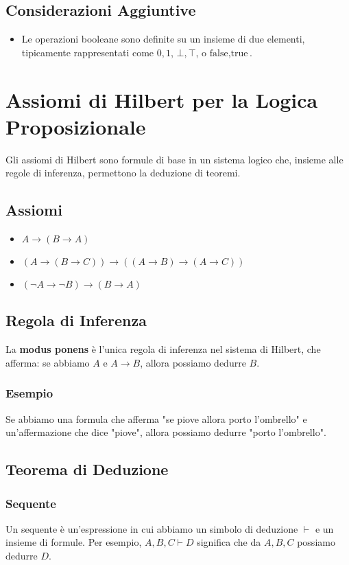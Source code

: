 \documentclass{article}
\begin{document}
\subsection{Considerazioni Aggiuntive}
\begin{itemize}
    \item Le operazioni booleane sono definite su un insieme di due elementi, tipicamente rappresentati come ${0, 1}$, ${\bot, \top}$, o ${\text{false}, \text{true}}$.
\end{itemize}
\newpage
\section{Assiomi di Hilbert per la Logica Proposizionale}

Gli assiomi di Hilbert sono formule di base in un sistema logico che, insieme alle regole di inferenza, permettono la deduzione di teoremi.

\subsection{Assiomi}
\begin{itemize}
    \item $A \to (B \to A)$
    \item $(A \to (B \to C)) \to ((A \to B) \to (A \to C))$
    \item $(\neg A \to \neg B) \to (B \to A)$
\end{itemize}

\subsection{Regola di Inferenza}
La \textbf{modus ponens} è l'unica regola di inferenza nel sistema di Hilbert, che afferma: se abbiamo $A$ e $A \to B$, allora possiamo dedurre $B$.

\subsubsection{Esempio}
Se abbiamo una formula che afferma "se piove allora porto l'ombrello" e un'affermazione che dice "piove", allora possiamo dedurre "porto l'ombrello".

\subsection{Teorema di Deduzione}
\subsubsection{Sequente}
Un sequente è un'espressione in cui abbiamo un simbolo di deduzione $\vdash$ e un insieme di formule. Per esempio, $A, B, C \vdash D$ significa che da $A, B, C$ possiamo dedurre $D$.
\end{document}
